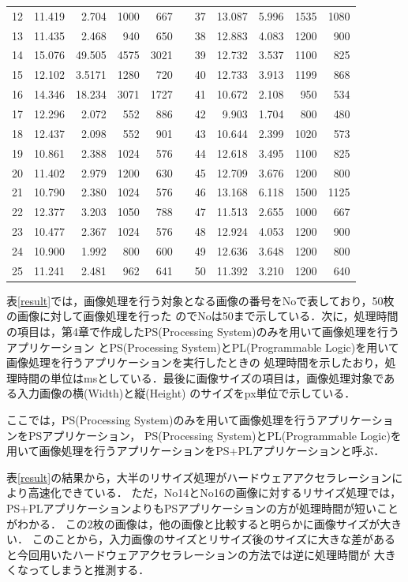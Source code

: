 \documentclass[11pt,a4j]{jreport}
\begin{document}
\begin{table}[H]
\begin{tabular}{|c|r|r|r|r|c|c|r|r|r|r|}
    12 & 11.419 & 2.704 & 1000 & 667 && 37 & 13.087 & 5.996 & 1535 & 1080 \\
    13 & 11.435 & 2.468 & 940 & 650 && 38 & 12.883 & 4.083 & 1200 & 900 \\
    14 & 15.076 & 49.505 & 4575 & 3021 && 39 & 12.732 & 3.537 & 1100 & 825 \\
    15 & 12.102 & 3.5171 & 1280 & 720 && 40 & 12.733 & 3.913 & 1199 & 868 \\
    16 & 14.346 & 18.234 & 3071 & 1727 && 41 & 10.672 & 2.108 & 950 & 534 \\
    17 & 12.296 & 2.072 & 552 & 886 && 42 & 9.903 & 1.704 & 800 & 480 \\
    18 & 12.437 & 2.098 & 552 & 901 && 43 & 10.644 & 2.399 & 1020 & 573 \\
    19 & 10.861 & 2.388 & 1024 & 576 && 44 & 12.618 & 3.495 & 1100 & 825 \\
    20 & 11.402 & 2.979 & 1200 & 630 && 45 & 12.709 & 3.676 & 1200 & 800 \\
    21 & 10.790 & 2.380 & 1024 & 576 && 46 & 13.168 & 6.118 & 1500 & 1125 \\
    22 & 12.377 & 3.203 & 1050 & 788 && 47 & 11.513 & 2.655 & 1000 & 667 \\
    23 & 10.477 & 2.367 & 1024 & 576 && 48 & 12.924 & 4.053 & 1200 & 900 \\
    24 & 10.900 & 1.992 & 800 & 600 && 49 & 12.636 & 3.648 & 1200 & 800 \\
    25 & 11.241 & 2.481 & 962 & 641 && 50 & 11.392 & 3.210 & 1200 & 640 \\
    \cline{1-5} \cline{7-11}
    \end{tabular}
\end{table}
表\ref{result}では，画像処理を行う対象となる画像の番号をNoで表しており，50枚の画像に対して画像処理を行った
のでNoは50まで示している．次に，処理時間の項目は，第4章で作成したPS(Processing System)のみを用いて画像処理を行うアプリケーション
とPS(Processing System)とPL(Programmable Logic)を用いて画像処理を行うアプリケーションを実行したときの
処理時間を示したおり，処理時間の単位はmsとしている．最後に画像サイズの項目は，画像処理対象である入力画像の横(Width)と縦(Height)
のサイズをpx単位で示している．

ここでは，PS(Processing System)のみを用いて画像処理を行うアプリケーションをPSアプリケーション，
PS(Processing System)とPL(Programmable Logic)を用いて画像処理を行うアプリケーションをPS+PLアプリケーションと呼ぶ．

表\ref{result}の結果から，大半のリサイズ処理がハードウェアアクセラレーションにより高速化できている．
ただ，No14とNo16の画像に対するリサイズ処理では，PS+PLアプリケーションよりもPSアプリケーションの方が処理時間が短いことがわかる．
この2枚の画像は，他の画像と比較すると明らかに画像サイズが大きい．
このことから，入力画像のサイズとリサイズ後のサイズに大きな差があると今回用いたハードウェアアクセラレーションの方法では逆に処理時間が
大きくなってしまうと推測する．
\end{document}
